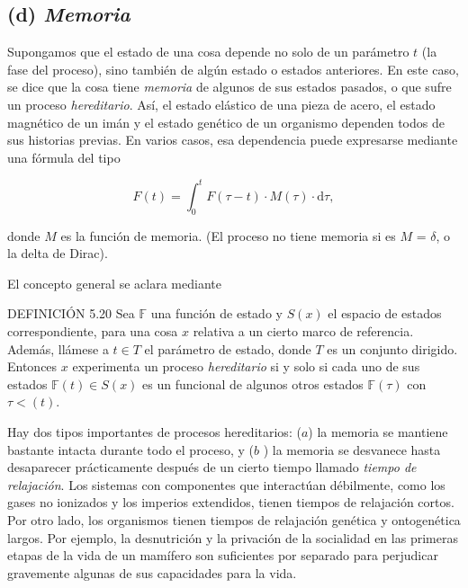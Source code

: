 \begin{justifying}
\begin{figure}[h!]
    \end{figure}

    \subsection*{(d)\textit{ Memoria}}
    \noindent Supongamos que el estado de una cosa depende no solo de un parámetro $t$ (la fase
    del proceso), sino también de algún estado o estados anteriores. 
    En este caso, se dice que la cosa tiene {\textit{memoria}} de algunos de sus estados pasados, 
    o que sufre un proceso {\textit{hereditario}}. Así, el estado elástico de una pieza
    de acero, el estado magnético de un imán y el estado genético de un organismo 
    dependen todos de sus historias previas. En varios casos, esa dependencia puede expresarse mediante una fórmula del tipo

    \[
        F(t) = \int_0^t F(\tau - t) \cdot M(\tau) \cdot \mathrm{d}\tau,
    \]

    \noindent donde $M$ es la función de memoria. (El proceso no tiene memoria si es $M$ = $\delta$,
    o la delta de Dirac).

    El concepto general se aclara mediante

    \medskip

    \noindent DEFINICIÓN 5.20 Sea $\mathbb{F}$ una función de estado y $S(x)$ el espacio de estados correspondiente,
    para una cosa $x$ relativa a un cierto marco de referencia. Además,
    llámese a $t \in T$ el parámetro de estado, donde $T$ es un conjunto dirigido. 
    Entonces $x$ experimenta un proceso {\textit{hereditario}} si y solo si cada uno de sus estados $\mathbb{F}(t) \in S(x)$ es un funcional 
    de algunos otros estados $\mathbb{F}(\tau)$ con $\tau<(t)$.

    Hay dos tipos importantes de procesos hereditarios: ($a$) la
    memoria se mantiene bastante intacta durante todo el proceso, y ($b$ ) 
    la memoria se desvanece hasta desaparecer prácticamente después de un cierto tiempo llamado {\textit{tiempo de relajación}}. 
    Los sistemas con componentes que interactúan débilmente, como
    los gases no ionizados y los imperios extendidos, tienen tiempos de relajación cortos. 
    Por otro lado, los organismos tienen tiempos de relajación genética y ontogenética largos. 
    Por ejemplo, la desnutrición y la privación de la socialidad en las primeras etapas de la vida de un mamífero son suficientes 
    por separado para perjudicar gravemente algunas de sus capacidades para la vida.


\end{justifying}
